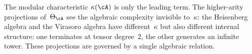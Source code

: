 \bigskip

\noindent
The modular characteristic $\kappa(\cA)$ is only the leading term.
The higher-arity projections of~$\Theta_\cA$ see the algebraic
complexity invisible to~$\kappa$: the Heisenberg algebra and the
Virasoro algebra have different~$\kappa$ but also different internal
structure: one terminates at tensor degree~$2$, the other generates
an infinite tower. These projections are governed by a single
algebraic relation.

